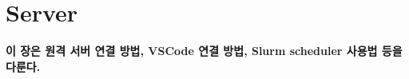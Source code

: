 \graphicspath{{./chap6/images/}}  
\chapter{Server}
\textbf{이 장은 원격 서버 연결 방법, VSCode 연결 방법, Slurm scheduler 사용법 등을 다룬다.}
